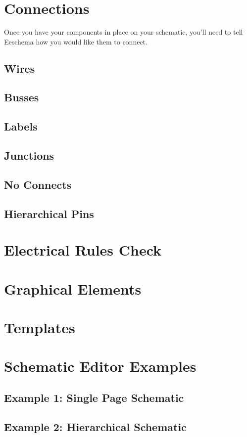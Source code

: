 \section{Connections}

Once you have your components in place on your schematic, you'll need to tell Eeschema how you would like them to connect.

\subsection{Wires}
\subsection{Busses}
\subsection{Labels}
\subsection{Junctions}
\subsection{No Connects}
\subsection{Hierarchical Pins}

\section{Electrical Rules Check}

\section{Graphical Elements}

\section{Templates}

\section{Schematic Editor Examples}
\subsection{Example 1: Single Page Schematic}
\subsection{Example 2: Hierarchical Schematic}
